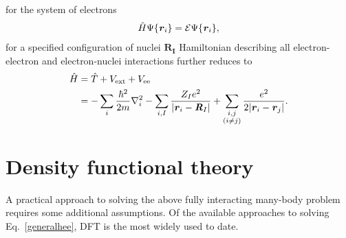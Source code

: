 for the system of electrons 
%
\begin{equation}\label{generaleeq}
\begin{aligned}
\hat{H}\Psi\{\textbf{\textit r}_i\}=\mathcal{E}\Psi\{\textbf{\textit r}_i\}, 
\end{aligned}
\end{equation}
%
for a specified configuration of nuclei $\mathbf{R_I}$ Hamiltonian describing all
electron-electron and electron-nuclei interactions further reduces to
%
\begin{equation}\label{generalhee2}
\begin{aligned}
\hat{H}&=\hat{T}+V_\text{ext}+V_\text{ee} \\
&=-\sum_i\frac{\hbar^2}{2m}\nabla_i^2-
\sum_{i,I}\frac{Z_Ie^2}{|\textbf{\textit r}_i-\textbf{\textit R}_I|}+
\sum_{\substack{i,j\\(i\neq j)}}\frac{e^2}{2|\textbf{\textit r}_i-\textbf{\textit r}_j|}.
\end{aligned}
\end{equation}

\section{Density functional theory}\label{ksdft}

A practical approach to solving the above fully interacting many-body problem
requires some additional assumptions. Of the available approaches to solving
Eq.~\ref{generalhee}, DFT is the most widely used to date. 

